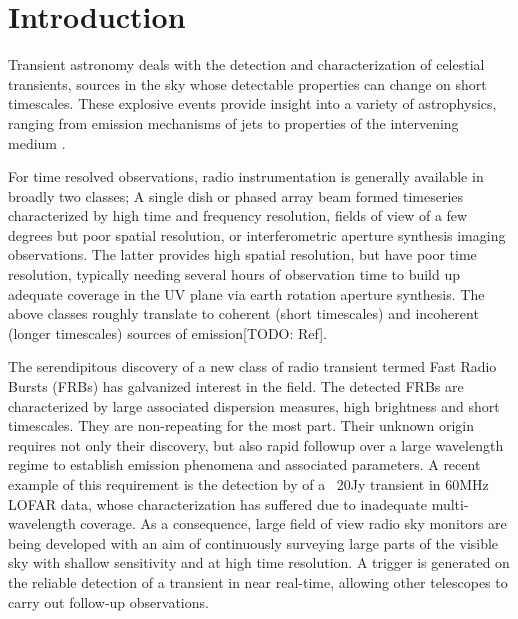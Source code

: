\documentclass{ws-jai}
\begin{document}
\section{\label{sec:Introduction}Introduction}

\noindent Transient astronomy  deals with the detection  and characterization of
celestial transients, sources in the  sky whose detectable properties can change
on short timescales.   These explosive events provide insight into  a variety of
astrophysics,  ranging from  emission mechanisms  of jets  to properties  of the
intervening  medium \citep{fender2006lofar,lazio2009dynamic}.  


For time resolved observations, radio  instrumentation is generally available in
broadly  two classes;  A  single dish  or phased  array  beam formed  timeseries
characterized by  high time and  frequency resolution, fields  of view of  a few
degrees  but  poor spatial  resolution,  or  interferometric aperture  synthesis
imaging observations.   The latter  provides high  spatial resolution,  but have
poor time  resolution, typically  needing several hours  of observation  time to
build  up  adequate  coverage  in  the UV  plane  via  earth  rotation  aperture
synthesis.  The above  classes roughly translate to  coherent (short timescales)
and incoherent (longer timescales) sources of emission[TODO: Ref].

The serendipitous discovery of a new  class of radio transient termed Fast Radio
Bursts  (FRBs)\citep{spitler2015fast,   thornton2013population}  has  galvanized
interest in the field.  The detected  FRBs are characterized by large associated
dispersion   measures,  high   brightness  and   short  timescales.    They  are
non-repeating for  the most part. Their  unknown origin requires not  only their
discovery, but also  rapid followup over a large wavelength  regime to establish
emission  phenomena  and  associated  parameters.   A  recent  example  of  this
requirement is the detection by \citet{stewart2016lofar} of a ~20Jy transient in
60MHz  LOFAR  data,  whose  characterization  has  suffered  due  to  inadequate
multi-wavelength  coverage. As  a consequence,  large  field of  view radio  sky
monitors are being  developed with an aim of continuously  surveying large parts
of  the visible  sky with  shallow sensitivity  and at  high time  resolution. A
trigger is generated on the reliable detection of a transient in near real-time,
allowing other telescopes to carry out follow-up observations.
\end{document}
